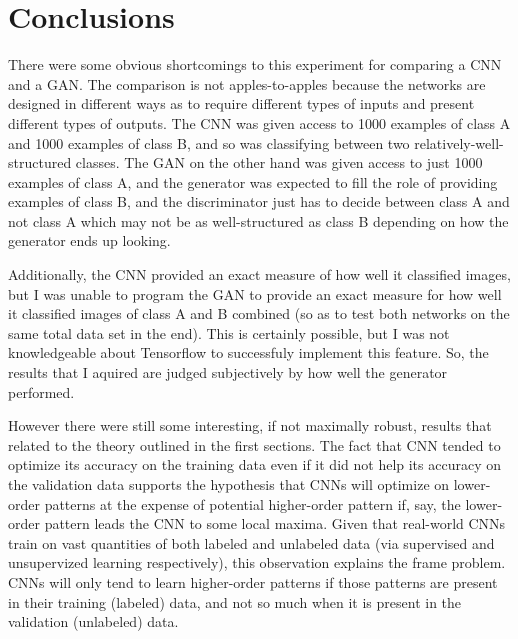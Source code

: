 \documentclass{article}
\begin{document}
\section{Conclusions}

There were some obvious shortcomings to this experiment for comparing a CNN and a GAN.
The comparison is not apples-to-apples because the networks are designed in different ways as to require different types of inputs and present different types of outputs.
The CNN was given access to 1000 examples of class A and 1000 examples of class B, and so was classifying between two relatively-well-structured classes.
The GAN on the other hand was given access to just 1000 examples of class A, and the generator was expected to fill the role of providing examples of class B, and the discriminator just has to decide between class A and not class A which may not be as well-structured as class B depending on how the generator ends up looking.

Additionally, the CNN provided an exact measure of how well it classified images, but I was unable to program the GAN to provide an exact measure for how well it classified images of class A and B combined (so as to test both networks on the same total data set in the end).
This is certainly possible, but I was not knowledgeable about Tensorflow to successfuly implement this feature.
So, the results that I aquired are judged subjectively by how well the generator performed.

However there were still some interesting, if not maximally robust, results that related to the theory outlined in the first sections.
The fact that CNN tended to optimize its accuracy on the training data even if it did not help its accuracy on the validation data supports the hypothesis that CNNs will optimize on lower-order patterns at the expense of potential higher-order pattern if, say, the lower-order pattern leads the CNN to some local maxima.
Given that real-world CNNs train on vast quantities of both labeled and unlabeled data (via supervised and unsupervized learning respectively), this observation explains the frame problem.
CNNs will only tend to learn higher-order patterns if those patterns are present in their training  (labeled) data, and not so much when it is present in the validation (unlabeled) data.
\end{document}
